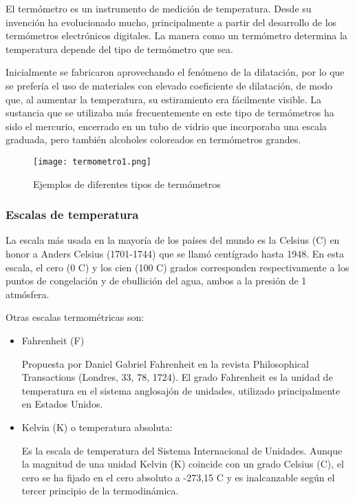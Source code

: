 \par 
El termómetro es un instrumento de medición de temperatura. Desde su invención ha evolucionado mucho, principalmente a partir del desarrollo de los termómetros electrónicos digitales. La manera como un termómetro determina la temperatura depende del tipo de termómetro que sea\cite{termometro}. 

\par \noindent
Inicialmente se fabricaron aprovechando el fenómeno de la dilatación, por lo que se prefería el uso de materiales con elevado coeficiente de dilatación, de modo que, al aumentar la temperatura, su estiramiento era fácilmente visible. La sustancia que se utilizaba más frecuentemente en este tipo de termómetros ha sido el mercurio, encerrado en un tubo de vidrio que incorporaba una escala graduada, pero también alcoholes coloreados en termómetros grandes\cite{termometro}.

\begin{figure}[H]
	\centering
	\texttt{[image: termometro1.png]}
	\caption{Ejemplos de diferentes tipos de termómetros}
\end{figure}

\subsubsection{Escalas de temperatura \cite{termometro}}

\par 
La escala más usada en la mayoría de los países del mundo es la Celsius (\textdegree{}C) en honor a Anders Celsius (1701-1744) que se llamó centígrado hasta 1948. En esta escala, el cero (0 \textdegree{}C) y los cien (100 \textdegree{}C) grados corresponden respectivamente a los puntos de congelación y de ebullición del agua, ambos a la presión de 1 atmósfera.

\par \noindent 
Otras escalas termométricas son:

\begin{itemize}
	
	\item Fahrenheit (\textdegree{}F) 
	
	Propuesta por Daniel Gabriel Fahrenheit en la revista Philosophical Transactions (Londres, 33, 78, 1724). El grado Fahrenheit es la unidad de temperatura en el sistema anglosajón de unidades, utilizado principalmente en Estados Unidos.
	
	\item Kelvin (K) o temperatura absoluta: 
	
	Es la escala de temperatura del Sistema Internacional de Unidades. Aunque la magnitud de una unidad Kelvin (K) coincide con un grado Celsius (\textdegree{}C), el cero se ha fijado en el cero absoluto a -273,15 \textdegree{}C y es inalcanzable según el tercer principio de la termodinámica.
\end{itemize}

